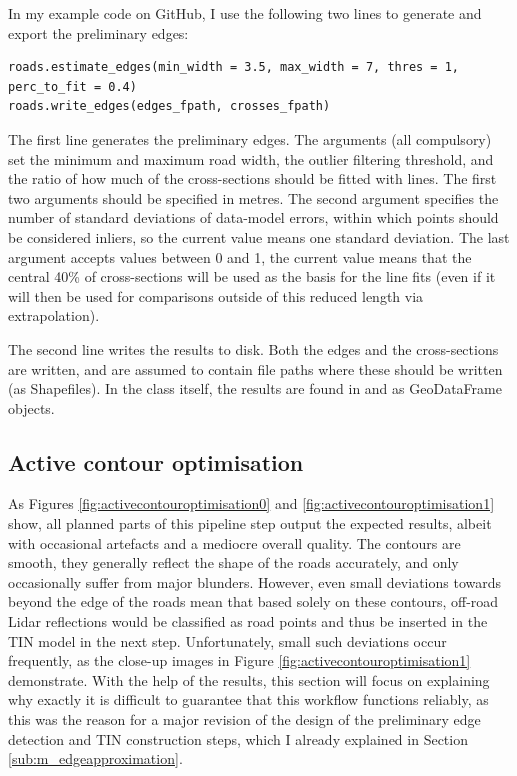 In my example code on GitHub, I use the following two lines to generate and export the preliminary edges:

\begin{lstlisting}
roads.estimate_edges(min_width = 3.5, max_width = 7, thres = 1, perc_to_fit = 0.4)
roads.write_edges(edges_fpath, crosses_fpath)
\end{lstlisting}

The first line generates the preliminary edges. The arguments (all compulsory) set the minimum and maximum road width, the outlier filtering threshold, and the ratio of how much of the cross-sections should be fitted with lines. The first two arguments should be specified in metres. The second argument specifies the number of standard deviations of data-model errors, within which points should be considered inliers, so the current value means one standard deviation. The last argument accepts values between 0 and 1, the current value means that the central 40\% of cross-sections will be used as the basis for the line fits (even if it will then be used for comparisons outside of this reduced length via extrapolation).

The second line writes the results to disk. Both the edges and the cross-sections are written,  and  are assumed to contain file paths where these should be written (as Shapefiles). In the class itself, the results are found in  and  as GeoDataFrame objects.

\subsection{Active contour optimisation}
\label{sub:r_activecontours}

As Figures \ref{fig:activecontouroptimisation0} and \ref{fig:activecontouroptimisation1} show, all planned parts of this pipeline step output the expected results, albeit with occasional artefacts and a mediocre overall quality. The contours are smooth, they generally reflect the shape of the roads accurately, and only occasionally suffer from major blunders. However, even small deviations towards beyond the edge of the roads mean that based solely on these contours, off-road Lidar reflections would be classified as road points and thus be inserted in the TIN model in the next step. Unfortunately, small such deviations occur frequently, as the close-up images in Figure \ref{fig:activecontouroptimisation1} demonstrate. With the help of the results, this section will focus on explaining why exactly it is difficult to guarantee that this workflow functions reliably, as this was the reason for a major revision of the design of the preliminary edge detection and TIN construction steps, which I already explained in Section \ref{sub:m_edgeapproximation}.

